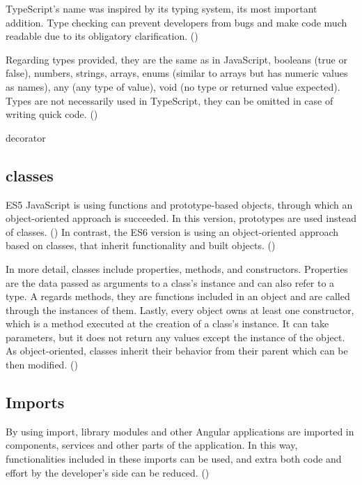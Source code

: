 TypeScript's name was inspired by its typing system, its most important addition. Type checking can prevent developers from bugs and make code much readable due to its obligatory clarification. (\cite{murray2018ng}) \par 

Regarding types provided, they are the same as in JavaScript, booleans (true or false), numbers, strings, arrays, enums (similar to arrays but has numeric values as names), any (any type of value), void (no type or returned value expected). Types are not necessarily used in TypeScript, they can be omitted in case of writing quick code. (\cite{murray2018ng}) \par
decorator
\subsection{classes} 


ES5 JavaScript is using functions and prototype-based objects, through which an object-oriented approach is succeeded. In this version, prototypes are used instead of classes. (\cite{murray2018ng}) In contrast, the ES6 version is using an object-oriented approach based on classes, that inherit functionality and built objects. (\cite{Typescript}) \par

In more detail, classes include properties, methods, and constructors. Properties are the data passed as arguments to a class's instance and can also refer to a type. A regards methods, they are functions included in an object and are called through the instances of them. Lastly, every object owns at least one constructor, which is a method executed at the creation of a class's instance. It can take parameters, but it does not return any values except the instance of the object. As object-oriented, classes inherit their behavior from their parent which can be then modified. (\cite{murray2018ng}) \par

\subsection{Imports}

By using import, library modules and other Angular applications are imported in components, services and other parts of the application. In this way, functionalities included in these imports can be used, and extra both code and effort by the developer's side can be reduced. (\cite{angularUpandRunning})

